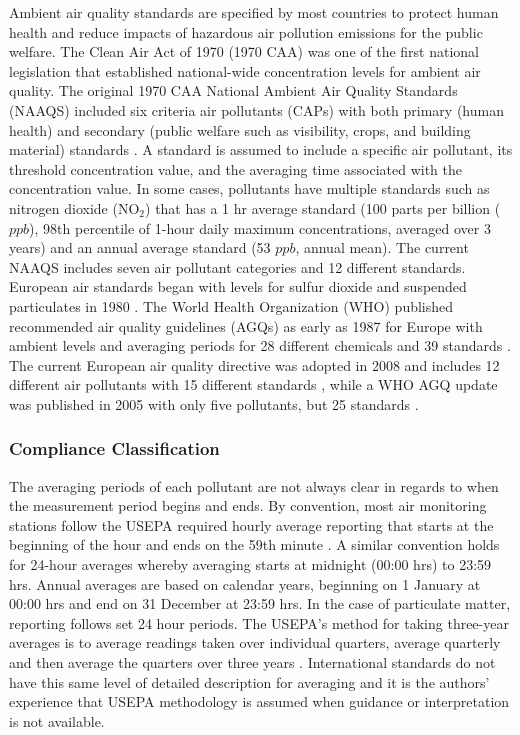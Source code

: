Ambient air quality standards are specified by most countries to protect human health and reduce impacts of hazardous air pollution emissions for the public welfare. The Clean Air Act of 1970 (1970 CAA) was one of the first national legislation that established national-wide concentration levels for ambient air quality.  The original 1970 CAA National Ambient Air Quality Standards (NAAQS) included six criteria air pollutants (CAPs) with both primary (human health) and secondary (public welfare such as visibility, crops, and building material) standards \citep{USEPA1970}. A standard is assumed to include a specific air pollutant, its threshold concentration value, and the averaging time associated with the concentration value. In some cases, pollutants have multiple standards such as nitrogen dioxide (NO$_{2}$) that has a 1 hr average standard (100 parts per billion ($ppb$), 98th percentile of 1-hour daily maximum concentrations, averaged over 3 years) and an annual average standard (53 $ppb $, annual mean). The current NAAQS includes seven air pollutant categories and 12 different standards. European air standards began with levels for sulfur dioxide and suspended particulates in 1980 \citep{EEC1980}. The World Health Organization (WHO) published recommended air quality guidelines (AGQs) as early as 1987 for Europe with ambient levels and averaging periods for 28 different chemicals and 39 standards \citep{Lubkert1994}. The current European air quality directive was adopted in 2008 and includes 12 different air pollutants with 15 different standards \citep{EU2008}, while a WHO AGQ update was published in 2005 with only five pollutants, but 25 standards \citep{WHO2006}. 

\subsubsection{Compliance Classification}

The averaging periods of each pollutant are not always clear in regards to when the measurement period begins and ends.  By convention, most air monitoring stations follow the USEPA required hourly average reporting that starts at the beginning of the hour and ends on the 59th minute \citep{CAA2007}.  A similar convention holds for 24-hour averages whereby averaging starts at midnight (00:00 hrs) to 23:59 hrs. Annual averages are based on calendar years, beginning on 1 January at 00:00 hrs and end on 31 December at 23:59 hrs.  In the case of particulate matter, reporting follows set 24 hour periods.  The USEPA’s method for taking three-year averages is to average readings taken over individual quarters, average quarterly and then average the quarters over three years \citep{Cohen1999}. International standards do not have this same level of detailed description for averaging and it is the authors’ experience that USEPA methodology is assumed when guidance or interpretation is not available.

